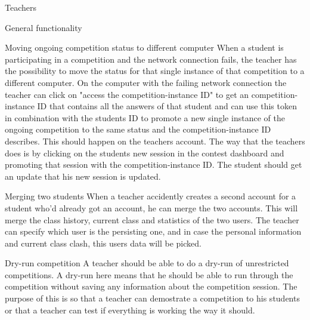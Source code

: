 \begin{section}{Teachers}
\begin{subsection}{General functionality}
\begin{subsubsection}{Moving ongoing competition status to different computer}
            When a student is participating in a competition and the network connection fails, the teacher has the possibility to move the status for that single instance of that competition to a different computer. On the computer with the failing network connection the teacher can click on "access the competition-instance ID" to get an competition-instance ID that contains all the answers of that student and can use this token in combination with the students ID to promote a new single instance of the ongoing competition to the same status and the competition-instance ID describes. This should happen on the teachers account. The way that the teachers does is by clicking on the students new session in the contest dashboard and promoting that session with the competition-instance ID. The student should get an update that his new session is updated. 
        \end{subsubsection}

        \begin{subsubsection}{Merging two students}
            When a teacher accidently creates a second account for a student
            who'd already got an account, he can merge the two accounts. This
            will merge the class history, current class and statistics of the
            two users. The teacher can specify which user is the persisting one,
            and in case the personal information and current class clash, this
            users data will be picked.
        \end{subsubsection}
        \begin{subsection}{Dry-run competition}
        A teacher should be able to do a dry-run of unrestricted competitions. A dry-run here means that he should be able to run through the competition without saving any information about the competition session. The purpose of this is so that  a teacher can demostrate a competition to his students or that a teacher can test if everything is working the way it should.
        \end{subsection}
    \end{subsection}

\end{section}
